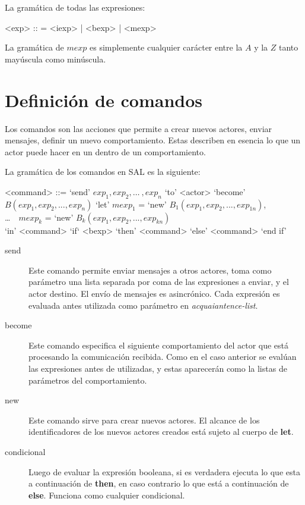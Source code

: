 La gramática de todas las expresiones:

\begin{grammar}
<exp> :: = <iexp> | <bexp> | <mexp> 
\end{grammar}

La gramática de $mexp$ es simplemente cualquier carácter entre la $A$ y la $Z$ tanto mayúscula como minúscula. 

\section{Definición de comandos}

Los comandos son las acciones que permite a \SAL crear nuevos actores, enviar mensajes, definir un nuevo comportamiento. Estas describen en esencia lo que un actor puede hacer en un dentro de un comportamiento.

La gramática de los comandos en SAL es la siguiente:

\begin{grammar}
  <command> ::= `send' $exp_1, exp_2, \ldots\ , exp_n$ `to' <actor>  
  \alt `become' $B(exp_1, exp_2, ..., exp_n)$
  \alt `let' $mexp_1$ = `new' $B_1(exp_1, exp_2, ..., exp_{1n})$, \\
   \ldots\ \ $mexp_k$ = `new' $B_k(exp_1, exp_2, ..., exp_{kn})$   \\
  `in' <command> 
  \alt `if` <bexp> `then' <command> `else' <command> `end if'
\end{grammar}

\begin{description}
\item [send] Este comando permite enviar mensajes a otros actores, toma como parámetro una lista separada por coma de las expresiones a enviar, y el actor destino. El envío de mensajes es asincrónico. Cada expresión es evaluada antes utilizada como parámetro en \textit{acquaiantence-list}.
\item [become] Este comando especifica el siguiente comportamiento del actor que está procesando la comunicación recibida. Como en el caso anterior se evalúan las expresiones antes de utilizadas, y estas aparecerán como la listas de parámetros del comportamiento. 
\item[new] Este comando sirve para crear nuevos actores. El alcance de los
  identificadores de los nuevos actores creados está sujeto al cuerpo de \textbf{let}.
\item[condicional] Luego de evaluar la expresión booleana, si es verdadera
  ejecuta lo que esta a continuación de \textbf{then}, en caso contrario lo que está a
  continuación de \textbf{else}. Funciona como cualquier condicional.
\end{description}

